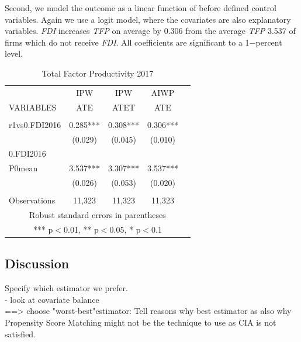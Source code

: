 \documentclass[a4paper,12pt]{scrartcl}
\begin{document}
Second, we model the outcome as a linear function of before defined control variables. Again we use a logit model, where the covariates are also explanatory variables. \textit{FDI} increases \textit{TFP} on average by 0.306 from the average  \textit{TFP} 3.537 of firms which do not receive \textit{FDI}. All coefficients are significant to a 1$-$percent level. 

\begin{table}[htbp]\centering
\caption{Total Factor Productivity 2017}
\begin{tabular}{lcccc} \hline
 & IPW  & IPW & AIWP \\
VARIABLES & ATE  & ATET  & ATE & \\ \hline
 &  &  &  \\
r1vs0.FDI2016 & 0.285***  & 0.308*** &   0.306***   \\
 \bigskip
 & (0.029)  & (0.045)  & (0.010)   \\

 
0.FDI2016  &   &    &  \\

P0mean &3.537***  &   3.307*** & 3.537***  \\

 &   (0.026) & (0.053) & (0.020) \\
 &  &  &    \\
 Observations & 11,323 & 11,323 & 11,323  \\ \hline
\multicolumn{5}{c}{ Robust standard errors in parentheses} \\
\multicolumn{5}{c}{ *** p$<$0.01, ** p$<$0.05, * p$<$0.1} \\
\end{tabular}
\end{table}

\newpage
\subsection{Discussion}
Specify which estimator we prefer.\\
- look at covariate balance \\
==> choose "worst-best"estimator: Tell reasons why best estimator as also why Propensity Score Matching might not be the technique to use as CIA is not satisfied. 

\end{document}
